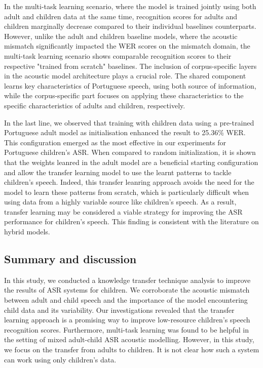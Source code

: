 In the multi-task learning scenario, where the model is trained jointly using both adult and children data at the same time, recognition scores for adults and children marginally decrease compared to their individual baselines counterparts. However, unlike the adult and children baseline models, where the acoustic mismatch significantly impacted the \ac{WER} scores on the mismatch domain, the multi-task learning scenario shows comparable recognition scores to their respective "trained from scratch" baselines. The inclusion of corpus-specific layers in the acoustic model architecture plays a crucial role. The shared component learns key characteristics of Portuguese speech, using both source of information, while the corpus-specific part focuses on applying these characteristics to the specific characteristics of adults and children, respectively.


In the last line, we observed that training with children data using a pre-trained Portuguese adult model as initialisation enhanced the result to 25.36\% \ac{WER}. This configuration emerged as the most effective in our experiments for Portuguese children's \ac{ASR}. When compared to random initialization, it is shown that the weights leanred in the adult model are a beneficial starting configuration and allow the transfer learning model to use the learnt patterns to tackle children's speech. Indeed, this transfer leanring approach avoids the need for the model to learn these patterns from scratch, which is particularly difficult when using data from a highly variable source like children's speech. As a result, transfer learning may be considered a viable strategy for improving the \ac{ASR} performance for children's speech. This finding is consistent with the literature on hybrid models\cite{TransferLF,TFchildren}. 


\subsection{Summary and discussion}
In this study, we conducted a knowledge transfer technique analysis to improve the results of \ac{ASR} systems for children. We corroborate the acoustic mismatch between adult and child speech and the importance of the model encountering child data and its variability. Our investigations revealed that the transfer learning approach is a promising way to improve low-resource children's speech recognition scores. Furthermore, multi-task learning was found to be helpful in the setting of mixed adult-child \ac{ASR} acoustic modelling.
However, in this study, we focus on the transfer from adults to children. It is not clear how such a system can work using only children's data.



